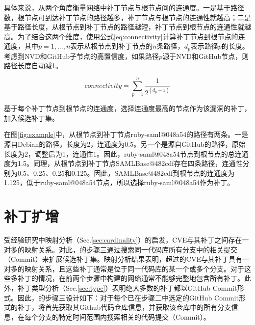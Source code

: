 具体来说，\tool 从两个角度衡量网络中补丁节点与根节点间的连通度。一是基于路径数，根节点可到达补丁节点的路径越多，补丁节点与根节点的连通性就越高；二是基于路径长度，从根节点到补丁节点的路径越短，补丁节点到根节点的连通性就越高。为了结合这两个维度，\tool 使用公式\ref{eq:connectivity}计算补丁节点到根节点的连通度，其中$ p = 1, ..., n$表示从根节点到补丁节点的$n$条路径，$d_p$表示路径$p$的长度。考虑到NVD和GitHub子节点的高置信度，如果路径$p$源于NVD和GitHub节点，则路径长度自动减1。

\begin{equation}\label{eq:connectivity}
    connectivity =\sum_{p=1}^{n}   \frac{1}{2^{({d}_{p} -1)}}
\end{equation}

基于每个补丁节点到根节点的连通度，\tool 选择连通度最高的节点作为该漏洞的补丁，加入候选补丁集。

\begin{exmp}
在图\ref{fig:example}中，从根节点到补丁节点ruby-saml@048a54的路径有两条。一是源自Debian的路径，长度为2，连通度为0.5。另一个是源自GitHub的路径，原始长度为2，调整后为1，连通性1。因此，ruby-saml@048a54节点到根节点的总连通度为1.5。同理，从根节点到补丁节点SAMLBase@482cdf存在四条路径，连通性分别为0.5、0.25、0.25和0.125。因此，SAMLBase@482cdf到根节点的连通度为1.125，低于ruby-saml@048a54节点，所以\tool 选择ruby-saml@048a54作为补丁。%
\end{exmp}


\section{补丁扩增}
受经验研究中映射分析（Sec.\ref{sec:cardinality}）的启发，CVE与其补丁之间存在一对多的映射关系。对此，\tool 的步骤三通过搜索同一代码库所有分支中的相关提交（Commit）来扩展候选补丁集。映射分析结果表明，超过的CVE与其补丁具有一对多的映射关系，且这些补丁通常是位于同一代码库的某一个或多个分支。对于这些多补丁的情况，\tool 在前两个步骤中构建的网络通常不能够完整地包含所有补丁。此外，补丁类型分析（Sec.\ref{sec:type}）表明绝大多数的补丁都以GitHub Commit形式。因此，\tool 的步骤三设计如下：对于每个已在步骤二中选定的GitHub Commit形式的补丁，\tool 将首先获取其Github代码仓库信息，并获取该仓库中的所有分支信息，在每个分支的特定时间范围内搜索相关的代码提交（Commit）。

